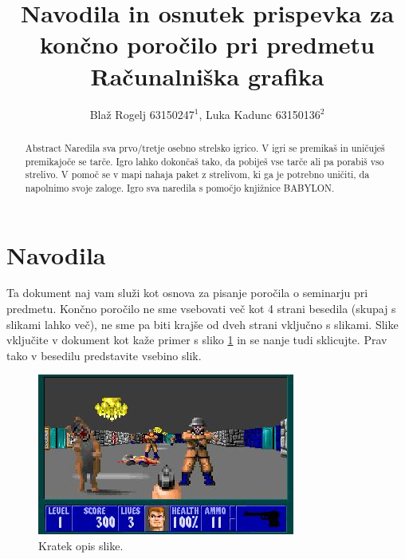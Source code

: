 \documentclass[a4paper]{article}
\begin{document}
\title{Navodila in osnutek prispevka za končno poročilo pri predmetu Računalniška grafika}

\author{Blaž Rogelj 63150247$^{1}$, Luka Kadunc 63150136$^{2}$} %



\maketitle


\begin{abstract}{Abstract}
Naredila sva prvo/tretje osebno strelsko igrico. V igri se premikaš in uničuješ premikajoče se tarče. 
Igro lahko dokončaš tako, da pobiješ vse tarče ali pa porabiš vso strelivo.
V pomoč se v mapi nahaja paket z strelivom, ki ga je potrebno uničiti, da napolnimo svoje zaloge.
Igro sva naredila s pomočjo knjižnice BABYLON.

\end{abstract}

\section*{Navodila}
Ta dokument naj vam služi kot osnova za pisanje poročila o seminarju pri predmetu. Končno poročilo ne sme vsebovati več kot 4 strani besedila (skupaj s slikami lahko več), ne sme pa biti krajše od dveh strani vključno s slikami. Slike vključite v dokument kot kaže primer s sliko \ref{fig:slika} in se nanje tudi sklicujte. Prav tako v besedilu predstavite vsebino slik.

\begin{figure}[!htb]
    \begin{center}
        \includegraphics[width=\columnwidth]{wolfenstein.jpg}
        \caption{Kratek opis slike.} \label{fig:slika}
    \end{center}
\end{figure}
\end{document}
